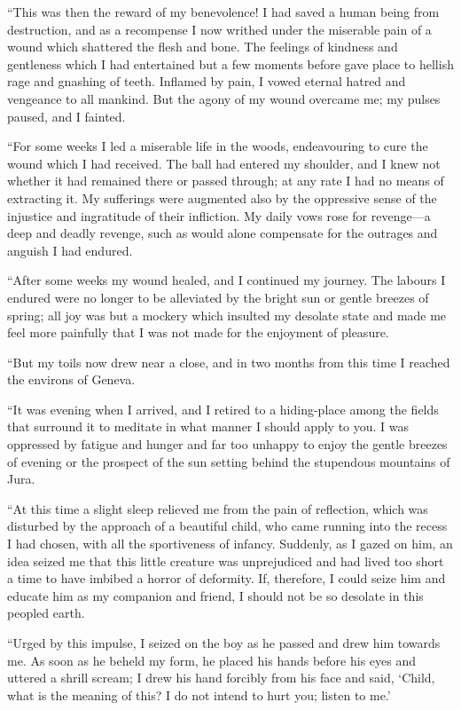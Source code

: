 \documentclass[12pt,openright]{book}
\begin{document}
“This was then the reward of my benevolence! I had saved a human being from destruction, and as a recompense I now writhed under the miserable pain of a wound which shattered the flesh and bone. The feelings of kindness and gentleness which I had entertained but a few moments before gave place to hellish rage and gnashing of teeth. Inflamed by pain, I vowed eternal hatred and vengeance to all mankind. But the agony of my wound overcame me; my pulses paused, and I fainted.

“For some weeks I led a miserable life in the woods, endeavouring to cure the wound which I had received. The ball had entered my shoulder, and I knew not whether it had remained there or passed through; at any rate I had no means of extracting it. My sufferings were augmented also by the oppressive sense of the injustice and ingratitude of their infliction. My daily vows rose for revenge—a deep and deadly revenge, such as would alone compensate for the outrages and anguish I had endured.

“After some weeks my wound healed, and I continued my journey. The labours I endured were no longer to be alleviated by the bright sun or gentle breezes of spring; all joy was but a mockery which insulted my desolate state and made me feel more painfully that I was not made for the enjoyment of pleasure.

“But my toils now drew near a close, and in two months from this time I reached the environs of Geneva.

“It was evening when I arrived, and I retired to a hiding-place among the fields that surround it to meditate in what manner I should apply to you. I was oppressed by fatigue and hunger and far too unhappy to enjoy the gentle breezes of evening or the prospect of the sun setting behind the stupendous mountains of Jura.

“At this time a slight sleep relieved me from the pain of reflection, which was disturbed by the approach of a beautiful child, who came running into the recess I had chosen, with all the sportiveness of infancy. Suddenly, as I gazed on him, an idea seized me that this little creature was unprejudiced and had lived too short a time to have imbibed a horror of deformity. If, therefore, I could seize him and educate him as my companion and friend, I should not be so desolate in this peopled earth.

“Urged by this impulse, I seized on the boy as he passed and drew him towards me. As soon as he beheld my form, he placed his hands before his eyes and uttered a shrill scream; I drew his hand forcibly from his face and said, ‘Child, what is the meaning of this? I do not intend to hurt you; listen to me.’
\end{document}
